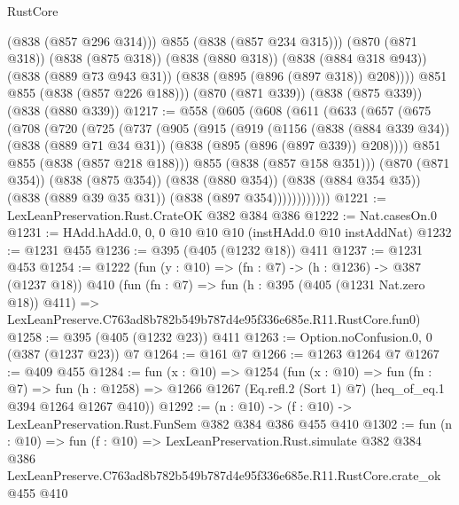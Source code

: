 \begin{lexlean}{RustCore}
\begin{coremodule}
              (@838 (@857 @296 @314)))
            @855
            (@838 (@857 @234 @315)))
          (@870 (@871 @318))
          (@838 (@875 @318))
          (@838 (@880 @318))
          (@838 (@884 @318 @943))
          (@838 (@889 @73 @943 @31))
          (@838 (@895 (@896 (@897 @318)) @208))))
      @851
      @855
      (@838 (@857 @226 @188)))
    (@870 (@871 @339))
    (@838 (@875 @339))
    (@838 (@880 @339))
@1217 := @558
    (@605
      (@608
        (@611
          (@633
            (@657
              (@675
                (@708
                  (@720
                    (@725
                      (@737
                        (@905
                          (@915
                            (@919
                              (@1156
                                (@838 (@884 @339 @34))
                                (@838 (@889 @71 @34 @31))
                                (@838 (@895 (@896 (@897 @339)) @208))))
                            @851
                            @855
                            (@838 (@857 @218 @188)))
                          @855
                          (@838 (@857 @158 @351)))
                        (@870 (@871 @354))
                        (@838 (@875 @354))
                        (@838 (@880 @354))
                        (@838 (@884 @354 @35))
                        (@838 (@889 @39 @35 @31))
                        (@838 (@897 @354))))))))))))
@1221 := LexLeanPreservation.Rust.CrateOK @382 @384 @386
@1222 := Nat.casesOn.{0}
@1231 := HAdd.hAdd.{0, 0, 0} @10 @10 @10 (instHAdd.{0} @10 instAddNat)
@1232 := @1231 @455
@1236 := @395 (@405 (@1232 @18)) @411
@1237 := @1231 @453
@1254 := @1222
    (fun (y : @10) => (fn : @7) -> (h : @1236) -> @387 (@1237 @18))
    @410
    (fun (fn : @7) =>
    fun (h : @395 (@405 (@1231 Nat.zero @18)) @411) =>
    LexLeanPreserve.C763ad8b782b549b787d4e95f336e685e.R11.RustCore.fun0)
@1258 := @395 (@405 (@1232 @23)) @411
@1263 := Option.noConfusion.{0, 0} (@387 (@1237 @23)) @7
@1264 := @161 @7
@1266 := @1263 @1264 @7
@1267 := @409 @455
@1284 := fun (x : @10) =>
  @1254
    (fun (x : @10) =>
    fun (fn : @7) =>
    fun (h : @1258) => @1266 @1267 (Eq.refl.{2} (Sort 1) @7) (heq_of_eq.{1} @394 @1264 @1267 @410))
@1292 := (n : @10) -> (f : @10) -> LexLeanPreservation.Rust.FunSem @382 @384 @386 @455 @410
@1302 := fun (n : @10) =>
  fun (f : @10) =>
  LexLeanPreservation.Rust.simulate
    @382
    @384
    @386
    LexLeanPreserve.C763ad8b782b549b787d4e95f336e685e.R11.RustCore.crate_ok
    @455
    @410
\end{coremodule}
\end{lexlean}
